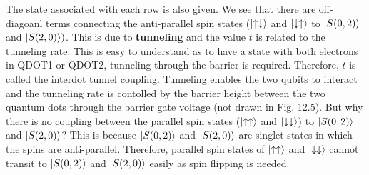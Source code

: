 \documentclass{article}
\begin{document}
The state associated with each row is also given. We see that there are off-diagoanl terms connecting the
anti-parallel spin states ($\ket{\uparrow\downarrow}$ and $\ket{\downarrow\uparrow}$ to $\ket{S(0,2)}$
and $\ket{S(2,0)})$. This is due to \textbf{tunneling} and the value $t$ is related to the tunneling rate.
This is easy to understand as to have a state with both electrons in QDOT1 or QDOT2, tunneling through the 
barrier is required. Therefore, $t$ is called the interdot tunnel coupling. Tunneling enables the two qubits to 
interact and the tunneling rate is contolled by the barrier height between the two quantum dots through
the barrier gate voltage (not drawn in Fig. 12.5). But why there is no coupling between
the parallel spin states ($\ket{\uparrow\uparrow}$ and $\ket{\downarrow\downarrow}$) to $\ket{S(0,2)}$
and $\ket{S(2,0)}$? This is because $\ket{S(0,2)}$ and $\ket{S(2,0)}$ are singlet states in which the spins are 
anti-parallel. Therefore, parallel spin states of $\ket{\uparrow\uparrow}$ and $\ket{\downarrow\downarrow}$ cannot
transit to $\ket{S(0,2)}$ and $\ket{S(2,0)}$ easily as spin flipping is needed.
\end{document}
